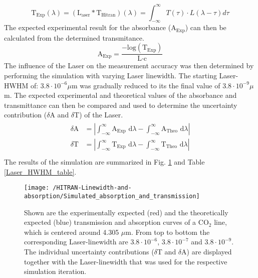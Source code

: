 \begin{equation}
	\text{T}_{\text{Exp}}(\lambda) =(\text{L}_{\text{aser}} * \text{T}_{\text{Hitran}})(\lambda) = \int_{-\infty}^{\infty} T(\tau) \cdot L(\lambda -\tau)  d\tau
\end{equation}
The expected experimental result for the absorbance ($\text{A}_{\text{Exp}}$) can then be calculated from the determined transmitance.
\begin{equation}
	\text{A}_{\text{Exp}}  = \frac{-\text{log}(\text{T}_{\text{Exp}})}{\text{L} \cdot \text{c}} 
\end{equation}
The influence of the Laser on the measurement accuracy was then determined by performing the simulation with varying Laser linewidth. The starting Laser-HWHM of: $3.8 \cdot 10^{-6} \mu$m was gradually reduced to its the final value of  $3.8 \cdot 10^{-9} \mu$m. The expected experimental and theoretical values of the absorbance and transmittance can then be compared and used to determine the uncertainty contribution ($\delta \text{A}$ and $\delta \text{T}$) of the Laser. 
\begin{align}
	\begin{split}
		\delta \text{A} &= \left| \int_{-\infty}^{\infty} \text{A}_{\text{Exp}} \text{ d}\lambda - \int_{-\infty}^{\infty}\text{A}_{\text{Theo}} \text{ d}\lambda \right| \\
		\delta \text{T} &= \left|\int_{-\infty}^{\infty} \text{T}_{\text{Exp}} \text{ d}\lambda - \int_{-\infty}^{\infty}\text{T}_{\text{Theo}} \text{ d}\lambda  \right| \\
	\end{split}
\end{align}
The results of the simulation are summarized in Fig. \ref{C02_pressuredependant_linewidth_1} and Table \ref{Laser_HWHM_table}.
\begin{figure}[H]
	\centering
	\texttt{[image: /HITRAN-Linewidth-and-absorption/Simulated\_absorption\_and\_transmission]}
	\caption{Shown are the experimentally expected (red) and the theoretically expected (blue) transmission and absorption curves of a CO$_2$ line, which is centered around 4.305 $\mu$m. From top to bottom the corresponding Laser-linewidth are $3.8 \cdot 10^{-6}$, $3.8 \cdot 10^{-7}$ and $3.8 \cdot 10^{-9}$. The individual uncertainty contributions ($\delta$T and $\delta$A) are displayed together with the Laser-linewidth that was used for the respective simulation iteration. }
	\label{C02_pressuredependant_linewidth_1}
\end{figure}
